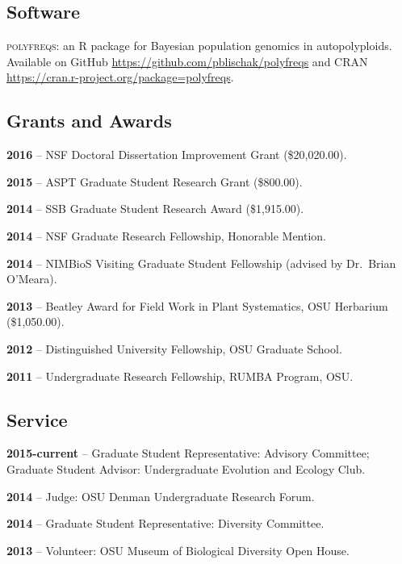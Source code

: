 \documentclass[]{article}
\begin{document}
\subsection{\texorpdfstring{\textbf{Software}}{Software}}\label{software}

\textsc{polyfreqs}: an R package for Bayesian population genomics in autopolyploids. Available on GitHub
\href{https://github.com/pblischak/polyfreqs}{\url{https://github.com/pblischak/polyfreqs}} and CRAN
\href{https://cran.r-project.org/package=polyfreqs}{\url{https://cran.r-project.org/package=polyfreqs}}.

\subsection{\texorpdfstring{\textbf{Grants and
Awards}}{Grants and Awards}}\label{grants-and-awards}

\textbf{2016} -- NSF Doctoral Dissertation Improvement Grant (\$20,020.00).

\textbf{2015} -- ASPT Graduate Student Research Grant (\$800.00).

\textbf{2014} -- SSB Graduate Student Research Award (\$1,915.00).

\textbf{2014} -- NSF Graduate Research Fellowship, Honorable Mention.

\textbf{2014} -- NIMBioS Visiting Graduate Student Fellowship (advised
by Dr.~Brian O'Meara).

\textbf{2013} -- Beatley Award for Field Work in Plant Systematics, OSU
Herbarium (\$1,050.00).

\textbf{2012} -- Distinguished University Fellowship, OSU Graduate
School.

\textbf{2011} -- Undergraduate Research Fellowship, RUMBA Program, OSU.

\subsection{\texorpdfstring{\textbf{Service}}{Service}}\label{service}

\textbf{2015-current} -- Graduate Student Representative: Advisory Committee; Graduate Student Advisor: Undergraduate Evolution and Ecology Club.

\textbf{2014} -- Judge: OSU Denman Undergraduate Research Forum.

\textbf{2014} -- Graduate Student Representative: Diversity Committee.

\textbf{2013} -- Volunteer: OSU Museum of Biological Diversity Open House.
\end{document}

